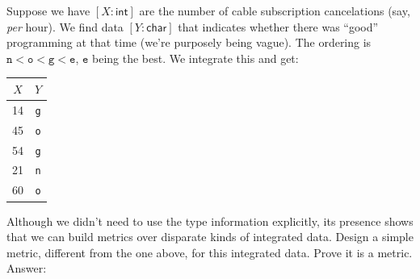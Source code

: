 \documentclass{article}
\begin{document}
Suppose we have $[X:\textsf{int}]$ are the number of cable subscription cancelations (say, {\it per} hour).  We find data $[Y:\textsf{char}]$ that  indicates whether there was  ``good'' programming at that time (we're purposely being vague).  The ordering is $\texttt{n} < \texttt{o} <  \texttt{g} < \texttt{e}$, $\texttt{e}$ being the best.  We integrate this and get:
\begin{center}
\begin{tabular}{cc}
$X$ & $Y$ \\ \hline \hline
14 & \texttt{g} \\
 45 & \texttt{o} \\
 54 & \texttt{g} \\
 21 & \texttt{n} \\
 60 & \texttt{o}
 \end{tabular}
 \end{center}
 Although we didn't need to use the type information explicitly, its presence shows that we can build metrics over disparate kinds of integrated data.   Design a simple metric, different from the one above, for this integrated data.  Prove it is a metric.\\
 Answer:\\
\end{document}
